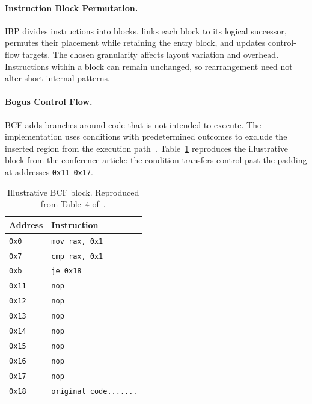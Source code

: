 \documentclass[runningheads]{llncs}
\begin{document}
\paragraph{Instruction Block Permutation.}
IBP divides instructions into blocks, links each block to its logical
successor, permutes their placement while retaining the entry block, and
updates control-flow targets. The chosen granularity affects layout
variation and overhead. Instructions within a block can remain unchanged,
so rearrangement need not alter short internal patterns.

\paragraph{Bogus Control Flow.}
BCF adds branches around code that is not intended to execute. The implementation uses conditions with predetermined outcomes to exclude the inserted region from the execution path~\cite{bin2binobf,llvmobf}. Table~\ref{table:bcf_code} reproduces the illustrative block from the conference article: the condition transfers control past the padding at addresses \texttt{0x11}--\texttt{0x17}.

\begin{table}[t]
\caption{Illustrative BCF block. Reproduced from Table~4 of~\cite{zone_secrypt_2026}.}
\small
\centering
\setlength{\tabcolsep}{3pt}
\label{table:bcf_code}
\begin{tabular}{ll}
    \hline
    \textbf{Address}    & \textbf{Instruction} \\ \hline

    \verb|0x0|  & 	\verb|mov rax, 0x1|  \\ \hline
    \verb|0x7|	&   \verb|cmp rax, 0x1|  \\ \hline
    \verb|0xb| 	&   \verb|je 0x18|  \\ \hline
    \verb|0x11|	&   \verb|nop|  \\ \hline
    \verb|0x12|	&   \verb|nop|  \\ \hline
    \verb|0x13|	&   \verb|nop|  \\ \hline
    \verb|0x14|	&   \verb|nop|  \\ \hline
    \verb|0x15|	&   \verb|nop|  \\ \hline
    \verb|0x16|	&   \verb|nop|  \\ \hline
    \verb|0x17|	&   \verb|nop|  \\ \hline
    \verb|0x18|	&\verb|original code.......|    \\ \hline
\end{tabular}
\end{table}
\end{document}
